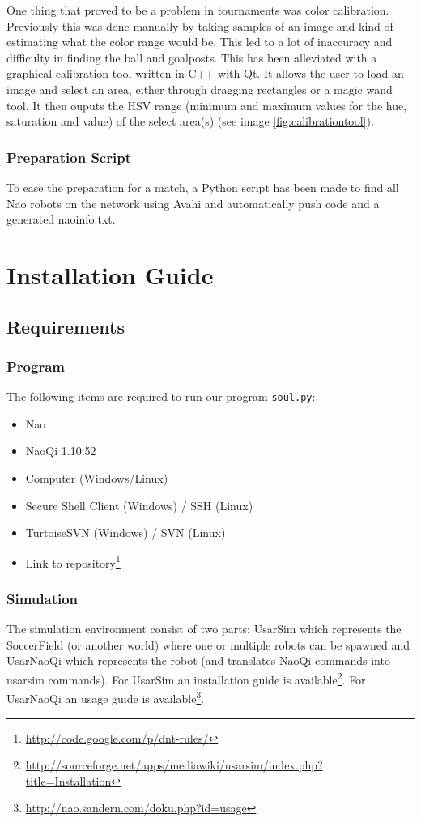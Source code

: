 \documentclass[11pt,a4paper,oneside]{article}
\begin{document}
One thing that proved to be a problem in tournaments was color calibration.
Previously this was done manually by taking samples of an image and kind of
estimating what the color range would be. This led to a lot of inaccuracy and
difficulty in finding the ball and goalposts. This has been alleviated with a
graphical calibration tool written in C++ with Qt. It allows the user to load an
image and select an area, either through dragging rectangles or a magic wand
tool. It then ouputs the HSV range (minimum and maximum values for the hue,
saturation and value) of the select area(s) (see image
\ref{fig:calibrationtool}).

\subsubsection{Preparation Script}
To ease the preparation for a match, a Python script has been made to find all Nao robots on the network using Avahi and automatically push code and a generated naoinfo.txt. 

\section{Installation Guide}
\subsection{Requirements}
\subsubsection{Program}
The following items are required to run our program \texttt{soul.py}:
\begin{itemize}
\item Nao
\item NaoQi 1.10.52
\item Computer (Windows/Linux)
\item Secure Shell Client (Windows) / SSH (Linux)
\item TurtoiseSVN (Windows) / SVN (Linux)
\item Link to repository\footnote{\url{http://code.google.com/p/dnt-rules/}}
\end{itemize}

\subsubsection{Simulation}
The simulation environment consist of two parts: UsarSim which represents the SoccerField (or another world) where one or multiple robots can be spawned and UsarNaoQi which represents the robot (and translates NaoQi commands into usarsim commands).
For UsarSim an installation guide is available\footnote{\url{http://sourceforge.net/apps/mediawiki/usarsim/index.php?title=Installation}}. For UsarNaoQi an usage guide is available\footnote{\url{http://nao.sandern.com/doku.php?id=usage}}.
\end{document}
